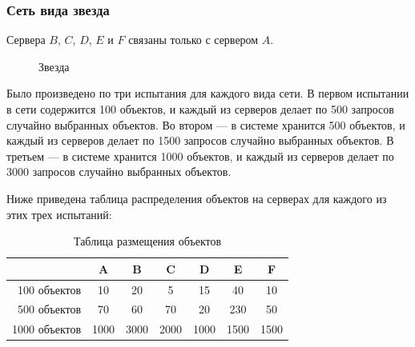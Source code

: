 			\subsubsection{Сеть вида звезда} 
				Сервера $B$, $C$, $D$, $E$ и $F$ связаны только с сервером $A$. 
				\begin{figure}[H] 
					\centering 
					\caption{Звезда} 
				\end{figure} 
		
			Было произведено по три испытания для каждого вида сети. В первом испытании в сети содержится 100 объектов, и каждый из серверов делает по 500 запросов случайно выбранных объектов.
			Во втором --- в системе хранится 500 объектов, и каждый из серверов делает по 1500 запросов случайно выбранных объектов. В третьем --- в системе хранится 1000 объектов, и каждый из серверов 
			делает по 3000 запросов случайно выбранных объектов. 
			
			Ниже приведена таблица распределения объектов на серверах для каждого из этих трех испытаний:
		
			\begin{table}[H]
				\small
				\centering
				\caption{Таблица размещения объектов}
				\begin{tabular} {|r|c|c|c|c|c|c|}
					\hline
						& A	    & B      & C      & D      & E     & F      \\
					\hline
	100 объектов		& 10    & 20     & 5      & 15     & 40    & 10     \\
	500 объектов		& 70	& 60	 & 70     & 20     & 230   & 50     \\
	1000 объектов		& 1000  & 3000   & 2000   & 1000   & 1500  & 1500   \\
					\hline
				\end{tabular}
			\end{table}
		
